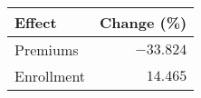 \begin{longtable}{lr}
\toprule
Effect & Change (\%) \\ 
\midrule\addlinespace[2.5pt]
Premiums & $-33.824$ \\ 
Enrollment & $14.465$ \\ 
\bottomrule
\end{longtable}

